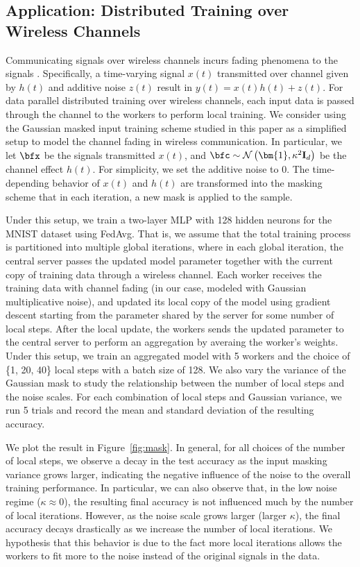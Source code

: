 \documentclass[10pt]{article} %
\theoremstyle{definition}
\theoremstyle{plain}
\newcommand{\paren}[1]{\left(#1\right)}
\def\bfI{{\mathbf{I}}}\def\bfJ{{\mathbf{J}}}\def\bfK{{\mathbf{K}}}\def\bfL{{\mathbf{L}}}
\begin{document}
\subsection{Application: Distributed Training over Wireless Channels}
Communicating signals over wireless channels incurs fading phenomena to the signals \citep{TseViswanath2005}. Specifically, a time-varying signal $x(t)$ transmitted over channel given by $h(t)$ and additive noise $z(t)$ result in $y(t) = x(t)h(t) + z(t)$. For data parallel distributed training over wireless channels, each input data is passed through the channel to the workers to perform local training. We consider using the Gaussian masked input training scheme studied in this paper as a simplified setup to model the channel fading in wireless communication. In particular, we let $\bfx$ be the signals transmitted $x(t)$, and $\bfc\sim\mathcal{N}\paren{\bm{1}, \kappa^2\bfI_d}$ be the channel effect $h(t)$. For simplicity, we set the additive noise to $0$. The time-depending behavior of $x(t)$ and $h(t)$ are transformed into the masking scheme that in each iteration, a new mask is applied to the sample.

Under this setup, we train a two-layer MLP with 128 hidden neurons for the MNIST dataset using FedAvg. That is, we assume that the total training process is partitioned into multiple global iterations, where in each global iteration, the central server passes the updated model parameter together with the current copy of training data through a wireless channel. Each worker receives the training data with channel fading (in our case, modeled with Gaussian multiplicative noise), and updated its local copy of the model using gradient descent starting from the parameter shared by the server for some number of local steps. After the local update, the workers sends the updated parameter to the central server to perform an aggregation by averaing the worker's weights. Under this setup, we train an aggregated model with 5 workers and the choice of \{1, 20, 40\} local steps with a batch size of 128. We also vary the variance of the Gaussian mask to study the relationship between the number of local steps and the noise scales. For each combination of local steps and Gaussian variance, we run 5 trials and record the mean and standard deviation of the resulting accuracy.

We plot the result in Figure~\ref{fig:mask}. In general, for all choices of the number of local steps, we observe a decay in the test accuracy as the input masking variance grows larger, indicating the negative influence of the noise to the overall training performance. In particular, we can also observe that, in the low noise regime ($\kappa \approx 0$), the resulting final accuracy is not influenced much by the number of local iterations. However, as the noise scale grows larger (larger $\kappa$), the final accuracy decays drastically as we increase the number of local iterations. We hypothesis that this behavior is due to the fact more local iterations allows the workers to fit more to the noise instead of the original signals in the data.
\end{document}
